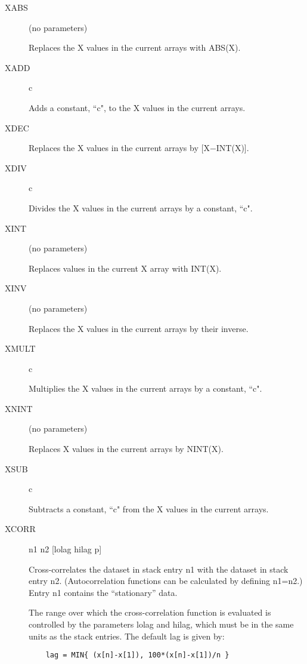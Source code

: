 \begin {description}
\item [XABS] (no parameters)

Replaces the X values in the current arrays with ABS(X).

\item [XADD] c

Adds a constant, ``c", to the X values in the current arrays.

\item [XDEC]

Replaces the X values in the current arrays by [X$-$INT(X)].

\item [XDIV] c

Divides the X values in the current arrays by a constant, ``c".

\item [XINT] (no parameters)

Replaces values in the current X array with INT(X).

\item [XINV] (no parameters)

Replaces the X values in the current arrays by their inverse.

\item [XMULT] c

Multiplies the X values in the current arrays by a constant, ``c".

\item [XNINT] (no parameters)

Replaces X values in the current arrays by NINT(X).

\item [XSUB] c

Subtracts a constant, ``c" from the X values in the current arrays.

\item [XCORR] n1 n2 [lolag hilag p]

Cross-correlates the dataset in stack entry n1 with the dataset in
stack entry n2. (Autocorrelation functions can be calculated by
defining n1=n2.) Entry n1 contains the ``stationary'' data.

The range over which the cross-correlation function is evaluated is
controlled by the parameters lolag and hilag, which must be in the
same units as the stack entries. The default lag is given by:

\begin{verbatim}
    lag = MIN{ (x[n]-x[1]), 100*(x[n]-x[1])/n }
\end{verbatim}


\end{description}
